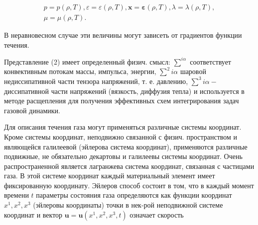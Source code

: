 \documentclass[10pt]{article}
\begin{document}
\[

\begin{gathered}

p=p(\rho, T), \varepsilon=\varepsilon(\rho, T), \boldsymbol{x}=\boldsymbol{\varepsilon}(\rho, T), \lambda=\lambda(\rho, T), \\

\mu=\mu(\rho, T) .

\end{gathered}

\]



В неравновесном случае эти величины могут зависеть от градиентов функции течения.



Представление (2) имеет определенный физич. смысл: $\sum^{i \alpha}$ соответствует конвективным потокам массы, импульса, энергии, $\sum^{2} i \alpha$ шаровой недиссипативной части тензора напряжений, т. е. давлению, $\sum^{3} i \alpha-$ диссипативной части напряжений (вязкость, диффузия тепла) и используется в методе расщепления для получения эффективных схем интегрирования задач газовой динамики.



Для описания течения газа могут применяться различные системы координат. Кроме системы координат, неподвижно связанной с физич. пространством и являющейся галилеевой (эйлерова система координат), применяются различные подвижные, не обязательно декартовы и галилеевы системы координат. Очень распространенной является лагранжева система координат, связанная с частицами газа. В этой системе координат каждый материальный элемент имеет фиксированную координату. Эйлеров способ состоит в том, что в каждый момент времени $t$ параметры состояния газа определяются как функции координат $x^{1}, x^{2}, x^{3}$ (эйлеровы координаты) точки в нек-рой неподвижной системе координат и вектор $\boldsymbol{u}=\boldsymbol{u}\left(x^{1}, x^{2}, x^{3}, t\right)$ означает скорость
\end{document}
